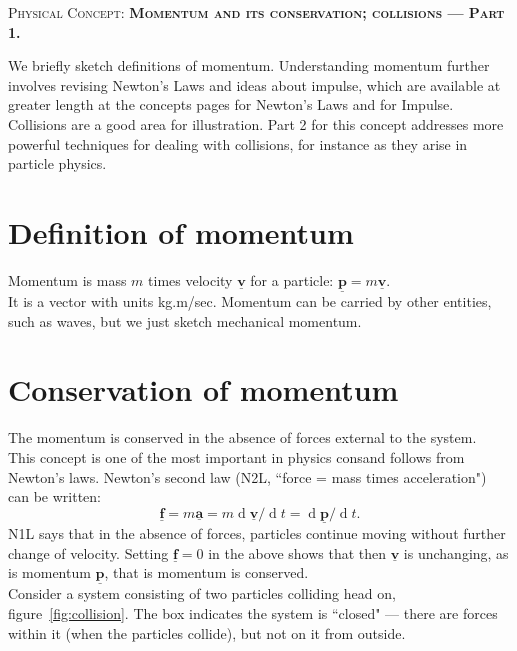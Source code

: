 \documentclass[a4paper,11pt]{article}
\newcommand{\vtr}[1] {\mathit{\underline{\boldsymbol{#1}}}}
\def\d{\operatorname{d}\!}
\begin{document}
\setlength{\columnsep}{22pt}
\textsc{\center \Large  Physical Concept: \textbf{Momentum and its conservation; collisions --- Part 1.}}
\vspace{0.4cm}

We briefly sketch definitions of momentum.  Understanding momentum further involves revising Newton's Laws and ideas about impulse, which are available at greater length at the concepts pages for Newton's Laws and for Impulse.  Collisions are a good area for illustration.  Part 2 for this concept addresses more powerful techniques for dealing with collisions, for instance as they arise in particle physics.

\section{Definition of momentum}
Momentum is mass $m$ times velocity $\vtr{v}$ for a particle: $\boxed{\vtr{p} = m \vtr{v}}$.\\
It is a vector with units kg.m/sec.  Momentum can be carried by other entities, such as waves, but we just sketch mechanical momentum.

\section{Conservation of momentum}
The momentum is conserved in the absence of forces external to the system.  \\
This concept is one of the most important in physics consand follows from Newton's laws.  Newton's second law (N2L, ``force = mass times acceleration") can be written:
\begin{equation*} \vtr{f} = m \vtr{a} = m \d\vtr{v}/\d t = \d\vtr{p}/\d t .
\end{equation*}
N1L says that in the absence of forces, particles continue moving without further change of velocity.  Setting $\vtr{f}= 0$ in the above shows that then $\vtr{v}$ is unchanging, as is momentum $\vtr{p}$, that is momentum is conserved.\\
Consider a system consisting of two particles colliding head on, figure~\ref{fig:collision}. The box indicates the system is ``closed" --- there are forces within it (when the particles collide), but not on it from outside.
\end{document}
